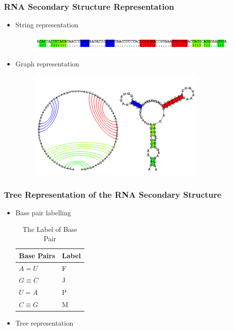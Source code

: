 \documentclass{beamer}
\begin{document}
\begin{frame}
\frametitle{RNA Secondary Structure Representation}
\begin{itemize}
\item String representation
\begin{figure}
	\includegraphics[width=1.0\linewidth]{RNAST1}
	\centering
\end{figure}
\item Graph representation
\begin{figure}
	\includegraphics[width=0.8\linewidth]{RNAST2}
	\centering
\end{figure}
\end{itemize}
\end{frame}
\begin{frame}
\frametitle{Tree Representation of the RNA Secondary Structure}
\begin{itemize}
\item Base pair labelling
\begin{table}
			\centering
			\begin{tabular}{l l}
				\toprule
				\textbf{Base Pairs} & \textbf{Label}\\
				\midrule
				$A = U$ & F\\
				$G \equiv C$ & J\\
				$U = A$ & P\\
				$C \equiv G$ & M\\
			\end{tabular}
		\caption{The Label of Base Pair}
\end{table}
\item Tree representation
\end{itemize}
\end{frame}
\end{document}
